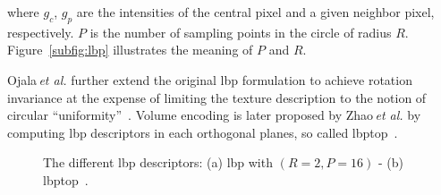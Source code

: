 \noindent where $g_c$, $g_{p}$ are the intensities of the central pixel and a given neighbor pixel, respectively. $P$ is the number of sampling points in the circle of radius $R$. Figure~\ref{subfig:lbp} illustrates the meaning of $P$ and $R$.

Ojala\,\textit{et al.} further extend the original \ac{lbp} formulation to achieve rotation invariance at the expense of limiting the texture description to the notion of circular ``uniformity''~\cite{ojala2002multiresolution}. Volume encoding is later proposed by Zhao\,\textit{et al.} by computing \ac{lbp} descriptors in each orthogonal planes, so called \ac{lbptop}~\cite{zhao2012rotation}.

\begin{figure}
  \centering
  \hspace*{\fill}
   \hfill
  \hspace*{\fill}
  \caption{The different \ac{lbp} descriptors: (a) \ac{lbp} with $(R=2,P=16)$ - (b) \ac{lbptop}~\cite{zhao2012rotation}.}
  \label{fig:lbp}
\end{figure}

